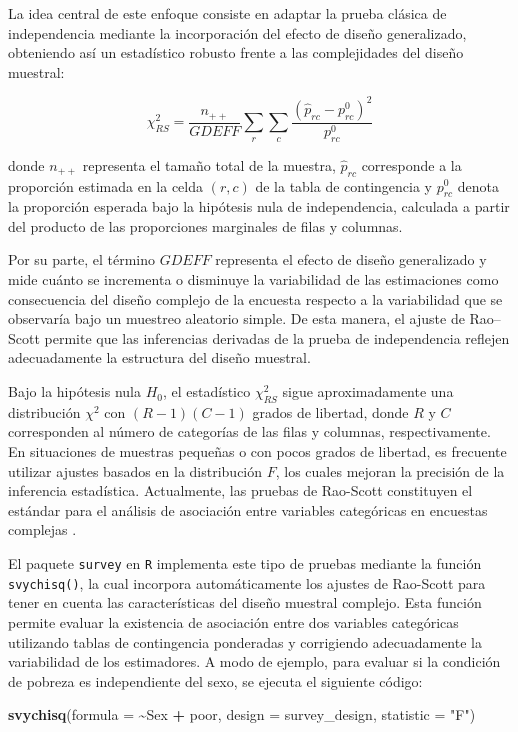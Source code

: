 \documentclass[
  spanish,
  12pt,
]{book}
\newenvironment{Shaded}{\begin{snugshade}}{\end{snugshade}}
\newcommand{\AttributeTok}[1]{\textcolor[rgb]{0.13,0.29,0.53}{#1}}
\newcommand{\FunctionTok}[1]{\textcolor[rgb]{0.13,0.29,0.53}{\textbf{#1}}}
\newcommand{\NormalTok}[1]{#1}
\newcommand{\SpecialCharTok}[1]{\textcolor[rgb]{0.81,0.36,0.00}{\textbf{#1}}}
\newcommand{\StringTok}[1]{\textcolor[rgb]{0.31,0.60,0.02}{#1}}
\begin{document}
La idea central de este enfoque consiste en adaptar la prueba clásica de independencia mediante la incorporación del efecto de diseño generalizado, obteniendo así un estadístico robusto frente a las complejidades del diseño muestral:

\[
\chi_{RS}^2 = \frac{n_{++}}{GDEFF} \sum_r \sum_c \frac{(\hat{p}_{rc} - p_{rc}^0)^2}{p_{rc}^0}
\]

donde \(n_{++}\) representa el tamaño total de la muestra, \(\hat{p}_{rc}\) corresponde a la proporción estimada en la celda \((r,c)\) de la tabla de contingencia y \(p_{rc}^0\) denota la proporción esperada bajo la hipótesis nula de independencia, calculada a partir del producto de las proporciones marginales de filas y columnas.

Por su parte, el término \(GDEFF\) \citep{heeringa2017applied} representa el efecto de diseño generalizado y mide cuánto se incrementa o disminuye la variabilidad de las estimaciones como consecuencia del diseño complejo de la encuesta respecto a la variabilidad que se observaría bajo un muestreo aleatorio simple. De esta manera, el ajuste de Rao--Scott permite que las inferencias derivadas de la prueba de independencia reflejen adecuadamente la estructura del diseño muestral.

Bajo la hipótesis nula \(H_0\), el estadístico \(\chi_{RS}^2\) sigue aproximadamente una distribución \(\chi^2\) con \((R-1)(C-1)\) grados de libertad, donde \(R\) y \(C\) corresponden al número de categorías de las filas y columnas, respectivamente. En situaciones de muestras pequeñas o con pocos grados de libertad, es frecuente utilizar ajustes basados en la distribución \(F\), los cuales mejoran la precisión de la inferencia estadística. Actualmente, las pruebas de Rao-Scott constituyen el estándar para el análisis de asociación entre variables categóricas en encuestas complejas \citep{heeringa2017applied}.

El paquete \texttt{survey} en \texttt{R} implementa este tipo de pruebas mediante la función \texttt{svychisq()}, la cual incorpora automáticamente los ajustes de Rao-Scott para tener en cuenta las características del diseño muestral complejo. Esta función permite evaluar la existencia de asociación entre dos variables categóricas utilizando tablas de contingencia ponderadas y corrigiendo adecuadamente la variabilidad de los estimadores. A modo de ejemplo, para evaluar si la condición de pobreza es independiente del sexo, se ejecuta el siguiente código:

\begin{Shaded}
\begin{Highlighting}[]
\FunctionTok{svychisq}\NormalTok{(}\AttributeTok{formula =} \SpecialCharTok{\textasciitilde{}}\NormalTok{Sex }\SpecialCharTok{+}\NormalTok{ poor, }\AttributeTok{design =}\NormalTok{ survey\_design, }\AttributeTok{statistic =} \StringTok{"F"}\NormalTok{)}
\end{Highlighting}
\end{Shaded}
\end{document}
